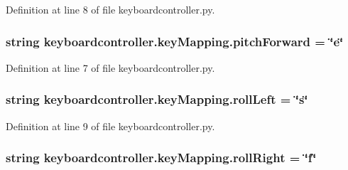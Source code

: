 Definition at line 8 of file keyboardcontroller.\-py.

\hypertarget{classkeyboardcontroller_1_1keyMapping_a95735ece4ea89e929997208cc3363fda}{
\subsubsection[{pitch\-Forward}]{\setlength{\rightskip}{0pt plus 5cm}string keyboardcontroller.\-key\-Mapping.\-pitch\-Forward = \char`\"{}e\char`\"{}\hspace{0.3cm}{\ttfamily [static]}}}\label{classkeyboardcontroller_1_1keyMapping_a95735ece4ea89e929997208cc3363fda}


Definition at line 7 of file keyboardcontroller.\-py.

\hypertarget{classkeyboardcontroller_1_1keyMapping_ae5a47e7e559336ceb20278098654bfc6}{
\subsubsection[{roll\-Left}]{\setlength{\rightskip}{0pt plus 5cm}string keyboardcontroller.\-key\-Mapping.\-roll\-Left = \char`\"{}s\char`\"{}\hspace{0.3cm}{\ttfamily [static]}}}\label{classkeyboardcontroller_1_1keyMapping_ae5a47e7e559336ceb20278098654bfc6}


Definition at line 9 of file keyboardcontroller.\-py.

\hypertarget{classkeyboardcontroller_1_1keyMapping_a460251be64a92ea67630150f33bc26eb}{
\subsubsection[{roll\-Right}]{\setlength{\rightskip}{0pt plus 5cm}string keyboardcontroller.\-key\-Mapping.\-roll\-Right = \char`\"{}f\char`\"{}\hspace{0.3cm}{\ttfamily [static]}}}\label{classkeyboardcontroller_1_1keyMapping_a460251be64a92ea67630150f33bc26eb}


